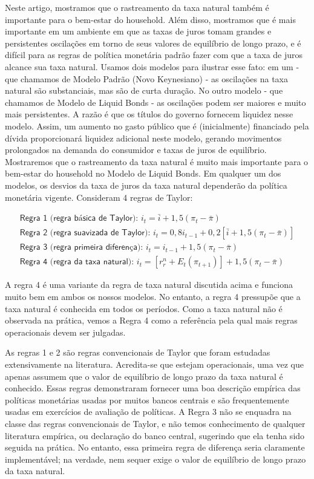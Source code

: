 \documentclass[11pt,oneside,a4paper]{article}
\begin{document}
Neste artigo, mostramos que o rastreamento da taxa natural também é importante para o bem-estar do household. Além disso, mostramos que é mais importante em um ambiente em que as taxas de juros tomam grandes e persistentes oscilações em torno de seus valores de equilíbrio de longo prazo, e é difícil para as regras de política monetária padrão fazer com que a taxa de juros alcance sua taxa natural. Usamos dois modelos para ilustrar esse fato: em um - que chamamos de Modelo Padrão (Novo Keynesiano) - as oscilações na taxa natural são substanciais, mas são de curta duração. No outro modelo - que chamamos de Modelo de Liquid Bonds - as oscilações podem ser maiores e muito mais persistentes. A razão é que os títulos do governo fornecem liquidez nesse modelo. Assim, um aumento no gasto público que é (inicialmente) financiado pela dívida proporcionará liquidez adicional neste modelo, gerando movimentos prolongados na demanda do consumidor e taxas de juros de equilíbrio. Mostraremos que o rastreamento da taxa natural é muito mais importante para o bem-estar do household no Modelo de Liquid Bonds. Em qualquer um dos modelos, os desvios da taxa de juros da taxa natural dependerão da política monetária vigente. Consideram 4 regras de Taylor:

\begin{align}
    \textsf{Regra 1 (regra básica de Taylor): }  i_t = \bar{i} + 1,5(\pi_t - \bar{\pi})  \\
    \textsf{Regra 2 (regra suavizada de Taylor): } i_t = 0,8i_{t-1} + 0,2[\bar{i} + 1,5(\pi_t - \bar{\pi}) ] \\
    \textsf{Regra 3 (regra primeira diferença): } i_t = i_{t-1} + 1,5(\pi_t - \bar{\pi}) \\
    \textsf{Regra 4 (regra da taxa natural): } i_t = [r_r^{n} + E_t(\pi_{t+1})] + 1,5(\pi_t - \bar{\pi}) 
\end{align}

A regra 4 é uma variante da regra de taxa natural discutida acima e funciona muito bem em ambos os nossos modelos. No entanto, a regra 4 pressupõe que a taxa natural é conhecida em todos os períodos. Como a taxa natural não é observada na prática, vemos a Regra 4 como a referência pela qual mais regras operacionais devem ser julgadas.

As regras 1 e 2 são regras convencionais de Taylor que foram estudadas extensivamente na literatura. Acredita-se que estejam operacionais, uma vez que apenas assumem que o valor de equilíbrio de longo prazo da taxa natural é conhecido. Essas regras demonstraram fornecer uma boa descrição empírica das políticas monetárias usadas por muitos bancos centrais e são frequentemente usadas em exercícios de avaliação de políticas. A Regra 3 não se enquadra na classe das regras convencionais de Taylor, e não temos conhecimento de qualquer literatura empírica, ou declaração do banco central, sugerindo que ela tenha sido seguida na prática. No entanto, essa primeira regra de diferença seria claramente implementável; na verdade, nem sequer exige o valor de equilíbrio de longo prazo da taxa natural.
\end{document}

